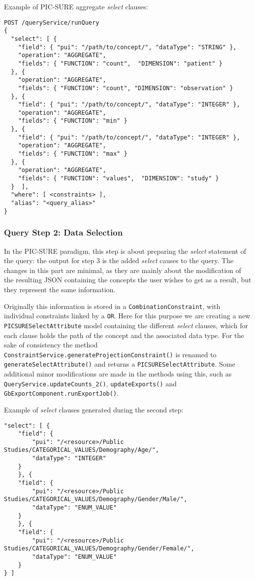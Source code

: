Example of PIC-SURE aggregate \emph{select} clauses:
\begin{verbatim}
POST /queryService/runQuery
{
  "select": [ {
    "field": { "pui": "/path/to/concept/", "dataType": "STRING" },
    "operation": "AGGREGATE",
    "fields": { "FUNCTION": "count",  "DIMENSION": "patient" }
  }, {
    "operation": "AGGREGATE",
    "fields": { "FUNCTION": "count", "DIMENSION": "observation" }
  }, {
    "field": { "pui": "/path/to/concept/", "dataType": "INTEGER" },
    "operation": "AGGREGATE",
    "fields": { "FUNCTION": "min" }
  }, {
    "field": { "pui": "/path/to/concept/", "dataType": "INTEGER" },
    "operation": "AGGREGATE",
    "fields": { "FUNCTION": "max" }
  }, {
    "operation": "AGGREGATE",
    "fields": { "FUNCTION": "values",  "DIMENSION": "study" }
  }  ],
  "where": [ <constraints> ],
  "alias": "<query_alias>"
}
\end{verbatim}


\subsubsection{Query Step 2: Data Selection}

In the PIC-SURE paradigm, this step is about preparing the \emph{select} statement of the query: the output for step 3 is the added \emph{select} causes to the query.
The changes in this part are minimal, as they are mainly about the modification of the resulting JSON containing the concepts the user wishes to get as a result, but they represent the same information.

Originally this information is stored in a \verb|CombinationConstraint|, with individual constraints linked by a \verb|OR|.
Here for this purpose we are creating a new \verb|PICSURESelectAttribute| model containing the different \emph{select} clauses, which for each clause holds the path of the concept and the associated data type.
For the sake of consistency the method \verb|ConstraintService.generateProjectionConstraint()| is renamed to \verb|generateSelectAttribute()| and returns a \verb|PICSURESelectAttribute|.
Some additional minor modifications are made in the methods using this, such as \verb|QueryService.updateCounts_2()|, \verb|updateExports()| and \verb|GbExportComponent.runExportJob()|.

Example of \emph{select} clauses generated during the second step:
\begin{verbatim}
"select": [ {
    "field": {
        "pui": "/<resource>/Public Studies/CATEGORICAL_VALUES/Demography/Age/",
        "dataType": "INTEGER"
    }
    }, {
    "field": {
        "pui": "/<resource>/Public Studies/CATEGORICAL_VALUES/Demography/Gender/Male/",
        "dataType": "ENUM_VALUE"
    }
    }, {
    "field": {
        "pui": "/<resource>/Public Studies/CATEGORICAL_VALUES/Demography/Gender/Female/",
        "dataType": "ENUM_VALUE"
    }
} ]
\end{verbatim}


